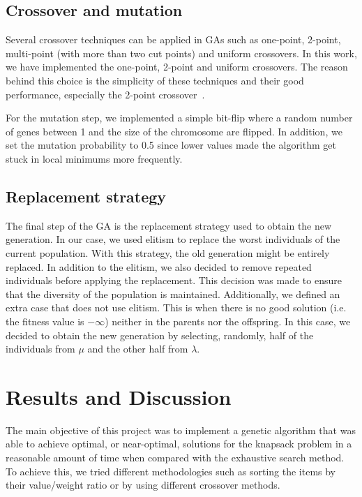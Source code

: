 \documentclass[anon]{CI}
\begin{document}
\subsection{Crossover and mutation}
Several crossover techniques can be applied in GAs such as one-point, 2-point, multi-point (with more than two cut points) and uniform crossovers. In this work, we have implemented the one-point, 2-point and uniform crossovers. The reason behind this choice is the simplicity of these techniques and their good performance, especially the 2-point crossover~\cite{HASANCEBI2000435, dejonganalysis, adeli1993integrated}.

For the mutation step, we implemented a simple bit-flip where a random number of genes between 1 and the size of the chromosome are flipped. In addition, we set the mutation probability to 0.5 since lower values made the algorithm get stuck in local minimums more frequently.

\subsection{Replacement strategy}
The final step of the GA is the replacement strategy used to obtain the new generation. In our case, we used elitism to replace the worst individuals of the current population. With this strategy, the old generation might be entirely replaced. In addition to the elitism, we also decided to remove repeated individuals before applying the replacement. This decision was made to ensure that the diversity of the population is maintained. Additionally, we defined an extra case that does not use elitism. This is when there is no good solution (i.e. the fitness value is $-\infty$) neither in the parents nor the offspring. In this case, we decided to obtain the new generation by selecting, randomly, half of the individuals from $\mu$ and the other half from $\lambda$.

\section{Results and Discussion}
The main objective of this project was to implement a genetic algorithm that was able to achieve optimal, or near-optimal, solutions for the knapsack problem in a reasonable amount of time when compared with the exhaustive search method. To achieve this, we tried different methodologies such as sorting the items by their value/weight ratio or by using different crossover methods.
\end{document}
